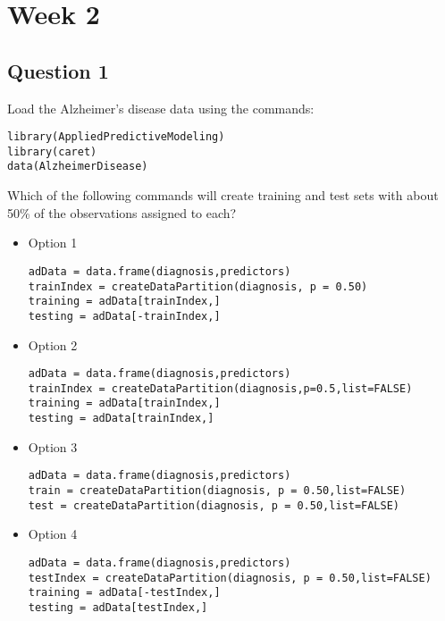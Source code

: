 \documentclass[DSS8main.tex]{subfiles}
\begin{document}
\section*{Week 2}
\subsection*{Question 1}
Load the Alzheimer's disease data using the commands:
\begin{framed}
\begin{verbatim}
library(AppliedPredictiveModeling)
library(caret)
data(AlzheimerDisease)
\end{verbatim}
\end{framed}
Which of the following commands will create training and test sets with about 50\% of the observations assigned to each?

\begin{itemize}
\item Option 1
\begin{verbatim}
adData = data.frame(diagnosis,predictors)
trainIndex = createDataPartition(diagnosis, p = 0.50)
training = adData[trainIndex,]
testing = adData[-trainIndex,]
\end{verbatim}
\item Option 2
\begin{verbatim} 
adData = data.frame(diagnosis,predictors)
trainIndex = createDataPartition(diagnosis,p=0.5,list=FALSE)
training = adData[trainIndex,]
testing = adData[trainIndex,]
\end{verbatim}
\item Option 3
\begin{verbatim}  
adData = data.frame(diagnosis,predictors)
train = createDataPartition(diagnosis, p = 0.50,list=FALSE)
test = createDataPartition(diagnosis, p = 0.50,list=FALSE)
\end{verbatim}
\item Option 4
\begin{verbatim}  
adData = data.frame(diagnosis,predictors)
testIndex = createDataPartition(diagnosis, p = 0.50,list=FALSE)
training = adData[-testIndex,]
testing = adData[testIndex,]
\end{verbatim}
\end{itemize}
\end{document}
